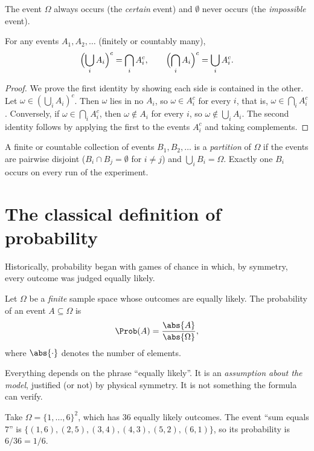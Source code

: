 The event $\Omega$ always occurs (the \emph{certain} event) and $\emptyset$ never
occurs (the \emph{impossible} event).

\begin{theorem}\label{thm:demorgan}
For any events $A_1,A_2,\dots$ (finitely or countably many),
\[
\Bigl(\bigcup_i A_i\Bigr)^c=\bigcap_i A_i^c,
\qquad
\Bigl(\bigcap_i A_i\Bigr)^c=\bigcup_i A_i^c .
\]
\end{theorem}
\begin{proof}
We prove the first identity by showing each side is contained in the other. Let
$\omega\in(\bigcup_i A_i)^c$. Then $\omega$ lies in no $A_i$, so
$\omega\in A_i^c$ for every $i$, that is, $\omega\in\bigcap_i A_i^c$.
Conversely, if $\omega\in\bigcap_i A_i^c$, then $\omega\notin A_i$ for every
$i$, so $\omega\notin\bigcup_i A_i$. The second identity follows by applying the
first to the events $A_i^c$ and taking complements.
\end{proof}

\begin{definition}[Partition]
A finite or countable collection of events $B_1,B_2,\dots$ is a
\emph{partition} of $\Omega$ if the events are pairwise disjoint
($B_i\cap B_j=\emptyset$ for $i\ne j$) and $\bigcup_i B_i=\Omega$. Exactly one
$B_i$ occurs on every run of the experiment.
\end{definition}

\section{The classical definition of probability}\label{sec:classical}

Historically, probability began with games of chance in which, by symmetry,
every outcome was judged equally likely.

\begin{definition}
Let $\Omega$ be a \emph{finite} sample space whose outcomes are equally likely.
The probability of an event $A\subseteq\Omega$ is
\[
\Prob(A)=\frac{\abs{A}}{\abs{\Omega}} ,
\]
where $\abs{\cdot}$ denotes the number of elements.
\end{definition}

Everything depends on the phrase ``equally likely''. It is an \emph{assumption
about the model}, justified (or not) by physical symmetry. It is not something
the formula can verify.

\begin{example}
Take $\Omega=\{1,\dots,6\}^2$, which has $36$ equally likely outcomes. The event
``sum equals $7$'' is $\{(1,6),(2,5),(3,4),(4,3),(5,2),(6,1)\}$, so its
probability is $6/36=1/6$.
\end{example}

